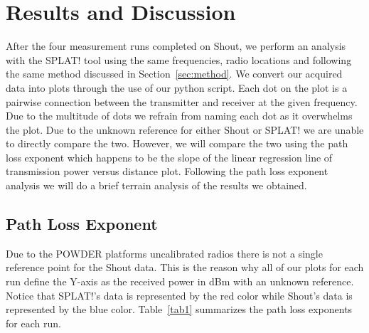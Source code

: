 
\section{Results and Discussion}
After the four measurement runs completed on Shout, we perform an analysis with the SPLAT! tool using the same frequencies, 
radio locations and following the same method discussed in Section~\ref{sec:method}.
We convert our acquired data into plots through the use of our python script. 
Each dot on the plot is a pairwise connection between the transmitter
and receiver at the given frequency. Due to the multitude of dots we refrain from naming each dot as it overwhelms the plot. Due to the unknown reference for either Shout or SPLAT! we are unable to directly compare the two.
However, we will compare the two using the path loss exponent which happens to be the slope of the linear regression line of transmission power versus distance plot. 
Following the path loss exponent analysis we will do a brief terrain analysis of the results we obtained. 

\subsection{Path Loss Exponent}
Due to the POWDER platforms uncalibrated radios there is not a single reference point for the Shout data. This is the reason 
why all of our plots for each run define the Y-axis as the received power in dBm with an unknown reference. Notice that SPLAT!'s
data is represented by the red color while Shout's data is represented by the blue color. Table~\ref{tab1} summarizes the path 
loss exponents for each run.

